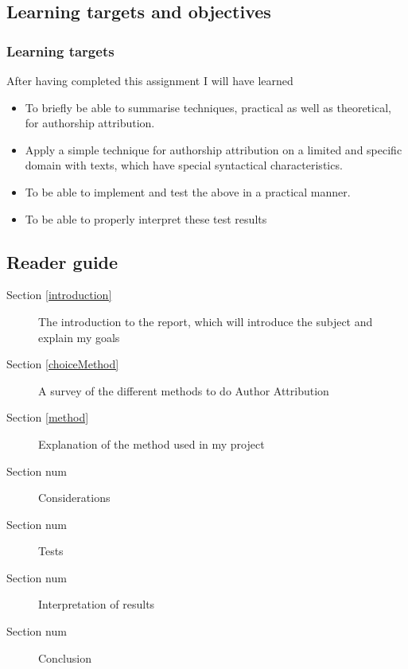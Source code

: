 \subsection{Learning targets and objectives}
\label{learning}
\subsubsection{Learning targets}
After having completed this assignment I will have learned 
\begin{itemize}
\item To briefly be able to summarise techniques, practical as well as theoretical, for authorship attribution.
\item Apply a simple technique for authorship attribution on a limited and specific domain with texts, which have special syntactical characteristics.
\item To be able to implement and test the above in a practical manner.
\item To be able to properly interpret these test results
\end{itemize}

\subsection{Reader guide}
\begin{description}
\item[Section \ref{introduction}] The introduction to the report, which will introduce the subject and explain my goals
\item[Section \ref{choiceMethod}] A survey of the different methods to do Author Attribution  
\item[Section \ref{method}] Explanation of the method used in my project
\item[Section num] Considerations
\item[Section num] Tests
\item[Section num] Interpretation of results
\item[Section num] Conclusion 
\end{description}

